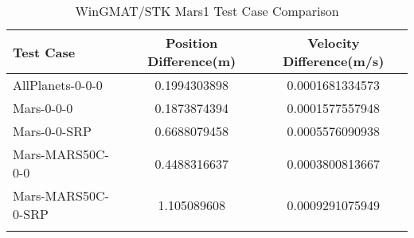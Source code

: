 \begin{table}[htbp!]
\centering
\caption{ WinGMAT/STK Mars1 Test Case Comparison}
      \begin{tabular}{lcc}
      \hline\hline
          Test Case & Position Difference(m) & Velocity Difference(m/s) \\
         \hline
         AllPlanets-0-0-0 & 0.1994303898 & 0.0001681334573 \\
         Mars-0-0-0 & 0.1873874394 & 0.0001577557948 \\
         Mars-0-0-SRP & 0.6688079458 & 0.0005576090938 \\
         Mars-MARS50C-0-0 & 0.4488316637 & 0.0003800813667 \\
         Mars-MARS50C-0-SRP & 1.105089608 & 0.0009291075949 \\
      \hline\hline
      \label{Table: Mars1 WinGMAT-STK Table} 
\end{tabular}
\end{table}
